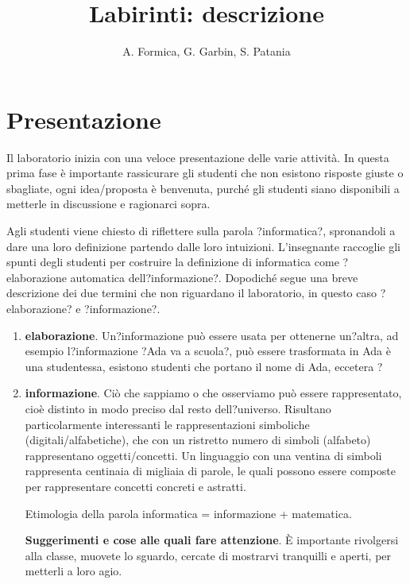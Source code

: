 \documentclass[12pt]{article}
\title{Labirinti: descrizione}
\author{A. Formica, G. Garbin, S. Patania}
\begin{document}
\maketitle
%
% 
\section{Presentazione}
Il laboratorio inizia con una veloce presentazione delle varie attività.
In questa prima fase è importante rassicurare gli studenti che non esistono risposte giuste o sbagliate, ogni idea/proposta è benvenuta, purché gli studenti siano disponibili a metterle in discussione e ragionarci sopra.

Agli studenti viene chiesto di riflettere sulla parola ?informatica?, spronandoli a dare una loro definizione partendo dalle loro intuizioni. L'insegnante raccoglie gli spunti degli studenti per costruire la definizione di informatica come ?elaborazione automatica dell?informazione?. Dopodiché segue una breve descrizione dei due termini che non riguardano il laboratorio, in questo caso ?elaborazione? e ?informazione?.

\begin{enumerate}
\item \textbf{elaborazione}. Un?informazione può essere usata per ottenerne un?altra, ad esempio  l?informazione ?Ada va a scuola?, può essere trasformata in Ada è una studentessa, esistono studenti che portano il nome di Ada, eccetera ?
\item \textbf{informazione}. Ciò che sappiamo o che osserviamo può essere rappresentato, cioè distinto in modo preciso dal resto dell?universo. Risultano particolarmente interessanti le rappresentazioni simboliche (digitali/alfabetiche), che con un ristretto numero di simboli (alfabeto) rappresentano oggetti/concetti. Un linguaggio con una ventina di simboli rappresenta centinaia di migliaia di parole, le quali possono essere composte per rappresentare concetti concreti e astratti.

Etimologia della parola informatica = informazione + matematica.

\textbf{Suggerimenti e cose alle quali fare attenzione}.
È importante rivolgersi alla classe, muovete lo sguardo, cercate di mostrarvi tranquilli e aperti, per metterli a loro agio.

\end{enumerate}
\end{document}
